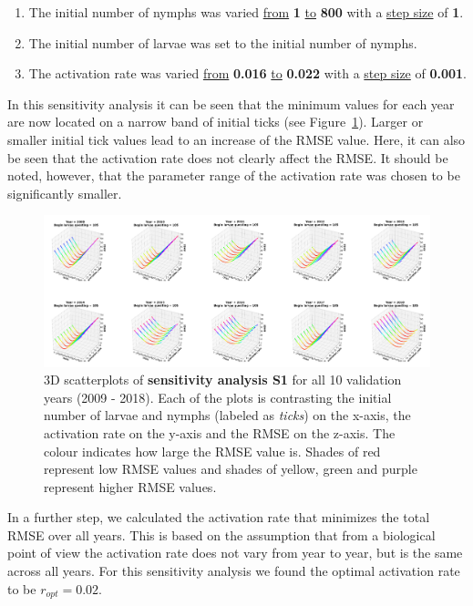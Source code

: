 \documentclass[a4paper, 11pt]{scrartcl}
\begin{document}
\begin{enumerate}
\item The initial number of nymphs was varied \underline{from} \textbf{1} \underline{to} \textbf{800} with a \underline{step size} of \textbf{1}.
\item The initial number of larvae was set to the initial number of nymphs.
\item The activation rate was varied \underline{from} \textbf{0.016} \underline{to} \textbf{0.022} with a \underline{step size} of \textbf{0.001}.
\end{enumerate}

In this sensitivity analysis it can be seen that the minimum values for each year are now located on a narrow band of initial ticks (see
Figure~\ref{fig:initial_ticks_with_beech_error}). Larger or smaller initial tick values lead to an increase of the RMSE value. Here, it can also be seen that the activation rate
does not clearly affect the RMSE. It should be noted, however, that the parameter range of the activation rate was chosen to be significantly smaller.

\begin{figure}[h!]
\centering
\includegraphics[width=\linewidth]{figures/initial_ticks_with_beech_error}
\caption{3D scatterplots of \textbf{sensitivity analysis S1} for all 10 validation years (2009 - 2018). Each of the plots is contrasting the initial number of larvae and nymphs
(labeled as \textit{ticks}) on the x-axis, the activation rate on the y-axis and the RMSE on the z-axis. The colour indicates how large the RMSE value is. Shades of red
represent low RMSE values and shades of yellow, green and purple represent higher RMSE values.}
\label{fig:initial_ticks_with_beech_error}
\end{figure}

In a further step, we calculated the activation rate that minimizes the total RMSE over all years. This is based on the assumption that from a biological point of view the
activation rate does not vary from year to year, but is the same across all years. For this sensitivity analysis we found the optimal activation rate to be $r_{opt} = 0.02$.
\end{document}
